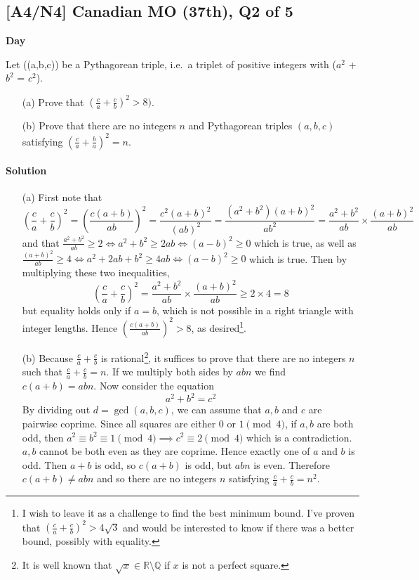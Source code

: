\documentclass[10pt]{article}
\newcommand{\themonth}{March}
\newcommand{\theyear}{2019}
\newcounter{day}
\newcounter{solution}
\newcounter{datenumber}
\newcommand{\problem}[4][0]{
	\newpage
	\subsection{[#3] \space #2} \hfill 
	{\large\textbf{Day \arabic{day}}} %
	\begin{flushleft} #4 \end{flushleft}
	\vspace{1em}
	\addtocounter{day}{1}
	\addtocounter{datenumber}{1}
	\setcounter{solution}{1}
}
\newcommand{\anonsolution}[2][0]{
	\paragraph{Solution \arabic{solution}} 
	\begin{flushleft} #2 \end{flushleft}
	\addtocounter{solution}{1}
	\vspace{1em}
}
\begin{document}
\problem[27]{2005 Canadian MO (37th), Q2 of 5}{A4/N4}{Let ((a,b,c)) be a Pythagorean triple, i.e.\ a triplet of positive integers with ($a^2$ + $b^2$ = $c^2$). \begin{enumerate} \item[(a)] Prove that $\left( \frac{c}{a} + \frac{c}{b} \right)^2 > 8)$. \item[(b)] Prove that there are no integers $n$ and Pythagorean triples $(a,b,c)$ satisfying $\left( \frac{c}{a} + \frac{b}{a} \right) ^2 = n$. \end{enumerate}}

\anonsolution[27]{\begin{enumerate} \item[(a)] First note that \[\left(\frac{c}{a}+\frac{c}{b}\right)^2 = \left(\frac{c(a+b)}{ab} \right)^2 = \frac{c^2(a+b)^2}{(ab)^2}=\frac{(a^2+b^2)(a+b)^2}{ab^2} = \frac{a^2+b^2}{ab}\times \frac{(a+b)^2}{ab}\] and that \(\frac{a^2+b^2}{ab}\geq 2 \iff a^2+b^2\geq 2ab \iff (a-b)^2\geq 0\) which is true, as well as \(\frac{(a+b)^2}{ab}\geq 4 \iff a^2+2ab+b^2 \geq 4ab \iff (a-b)^2\geq 0\) which is true. Then by multiplying these two inequalities, \[\left(\frac{c}{a}+\frac{c}{b}\right)^2= \frac{a^2+b^2}{ab}\times \frac{(a+b)^2}{ab} \geq 2\times 4=8\] but equality holds only if \(a=b\), which is not possible in a right triangle with integer lengths. Hence \(\left(\frac{c(a+b)}{ab} \right)^2 >8\), as desired\footnote{I wish to leave it as a challenge to find the best minimum bound. I've proven that \( \left(\frac{c}{a}+\frac{c}{b}\right)^2>4\sqrt{3}\) and would be interested to know if there was a better bound, possibly with equality.}. \item[(b)] Because \(\frac{c}{a}+\frac{c}{b}\) is rational\footnote{It is well known that \(\sqrt{x}\in \mathbb{R}\setminus \mathbb{Q}\) if \(x\) is not a perfect square.}, it suffices to prove that there are no integers \(n\) such that \(\frac{c}{a}+\frac{c}{b}=n\). If we multiply both sides by \(abn\) we find \(c(a+b)=abn\). Now consider the equation \[a^2+b^2=c^2\] By dividing out \(d=\gcd(a,b,c)\), we can assume that \(a,b\) and \(c\) are pairwise coprime. Since all squares are either \(0\) or \(1\pmod 4\), if \(a,b\) are both odd, then \(a^2\equiv b^2\equiv 1\pmod 4 \implies c^2\equiv 2 \pmod 4\) which is a contradiction. \(a,b\) cannot be both even as they are coprime. Hence exactly one of \(a\) and \(b\) is odd. Then \(a+b\) is odd, so \(c(a+b)\) is odd, but \(abn\) is even. Therefore \(c(a+b)\neq abn\) and so there are no integers \(n\) satisfying \(\frac{c}{a}+\frac{c}{b}=n^2\). \end{enumerate}}
\end{document}
